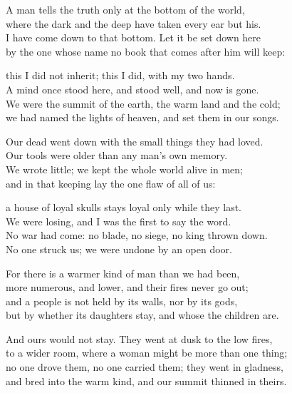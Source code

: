 
\begin{founder}
A man tells the truth only at the bottom of the world,\\
where the dark and the deep have taken every ear but his.\\
I have come down to that bottom. Let it be set down here\\
by the one whose name no book that comes after him will keep:\\
\medskip

this I did not inherit; this I did, with my two hands.\\
A mind once stood here, and stood well, and now is gone.\\
We were the summit of the earth, the warm land and the cold;\\
we had named the lights of heaven, and set them in our songs.\\
\medskip

Our dead went down with the small things they had loved.\\
Our tools were older than any man's own memory.\\
We wrote little; we kept the whole world alive in men;\\
and in that keeping lay the one flaw of all of us:\\
\medskip

a house of loyal skulls stays loyal only while they last.\\
We were losing, and I was the first to say the word.\\
No war had come: no blade, no siege, no king thrown down.\\
No one struck us; we were undone by an open door.\\
\medskip

For there is a warmer kind of man than we had been,\\
more numerous, and lower, and their fires never go out;\\
and a people is not held by its walls, nor by its gods,\\
but by whether its daughters stay, and whose the children are.\\
\medskip

And ours would not stay. They went at dusk to the low fires,\\
to a wider room, where a woman might be more than one thing;\\
no one drove them, no one carried them; they went in gladness,\\
and bred into the warm kind, and our summit thinned in theirs.\\
\medskip


\end{founder}
